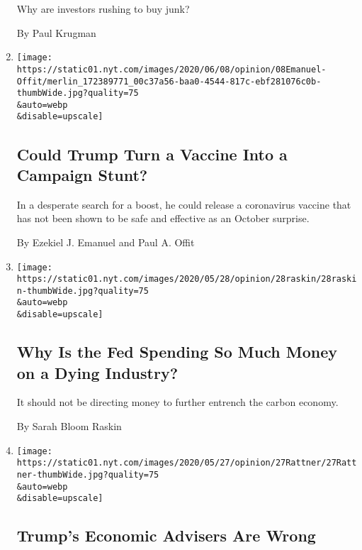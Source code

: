 \begin{enumerate}
  Why are investors rushing to buy junk?

  By Paul Krugman
\item
  \href{/2020/06/08/opinion/trump-coronavirus-vaccine.html}{}

  \texttt{[image: https://static01.nyt.com/images/2020/06/08/opinion/08Emanuel-Offit/merlin\_172389771\_00c37a56-baa0-4544-817c-ebf281076c0b-thumbWide.jpg?quality=75\\\&auto=webp\\\&disable=upscale]}

  \hypertarget{could-trump-turn-a-vaccine-into-a-campaign-stunt}{%
  \subsection{Could Trump Turn a Vaccine Into a Campaign
  Stunt?}\label{could-trump-turn-a-vaccine-into-a-campaign-stunt}}

  In a desperate search for a boost, he could release a coronavirus
  vaccine that has not been shown to be safe and effective as an October
  surprise.

  By Ezekiel J. Emanuel and Paul A. Offit
\item
  \href{/2020/05/28/opinion/fed-fossil-fuels.html}{}

  \texttt{[image: https://static01.nyt.com/images/2020/05/28/opinion/28raskin/28raskin-thumbWide.jpg?quality=75\\\&auto=webp\\\&disable=upscale]}

  \hypertarget{why-is-the-fed-spending-so-much-money-on-a-dying-industry}{%
  \subsection{Why Is the Fed Spending So Much Money on a Dying
  Industry?}\label{why-is-the-fed-spending-so-much-money-on-a-dying-industry}}

  It should not be directing money to further entrench the carbon
  economy.

  By Sarah Bloom Raskin
\item
  \href{/2020/05/27/opinion/coronavirus-economy-stimulus.html}{}

  \texttt{[image: https://static01.nyt.com/images/2020/05/27/opinion/27Rattner/27Rattner-thumbWide.jpg?quality=75\\\&auto=webp\\\&disable=upscale]}

  \hypertarget{trumps-economic-advisers-are-wrong}{%
  \subsection{Trump's Economic Advisers Are
  Wrong}\label{trumps-economic-advisers-are-wrong}}


\end{enumerate}
